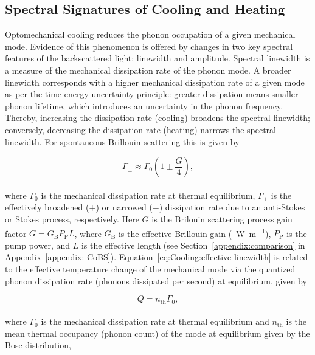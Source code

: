 \subsection{Spectral Signatures of Cooling and Heating}
\label{Cooling:subsec:SpectralSignaturesofCoolingandHeating}

Optomechanical cooling reduces the phonon occupation of a given mechanical mode. Evidence of this phenomenon is offered by changes in two key spectral features of the backscattered light: linewidth and amplitude. Spectral linewidth is a measure of the mechanical dissipation rate of the phonon mode. A broader linewidth corresponds with a higher mechanical dissipation rate of a given mode as per the time-energy uncertainty principle: greater dissipation means smaller phonon lifetime, which introduces an uncertainty in the phonon frequency. Thereby, increasing the dissipation rate (cooling) broadens the spectral linewidth; conversely, decreasing the dissipation rate (heating) narrows the spectral linewidth. For spontaneous Brillouin scattering this is given by \cite{otterstrom2018optomechanical}

\begin{equation}
  \Gamma_{\pm} \approx \Gamma_{0}\left(1 \pm \frac{G}{4}\right),
  \label{eq:Cooling:effective linewidth}
\end{equation}
\\
where \(\Gamma_{0}\) is the mechanical dissipation rate at thermal equilibrium, \(\Gamma_{\pm}\) is the effectively broadened (\(+\)) or narrowed (\(-\)) dissipation rate due to an anti-Stokes or Stokes process, respectively. Here \(G\) is the Brilouin scattering process gain factor \(G = G_{\mathrm{B}}P_{\mathrm{P}}L\), where \(G_{\mathrm{B}}\) is the effective Brillouin gain (\si{\per\watt\per\meter}), \(P_{\mathrm{P}}\) is the pump power, and \(L\) is the effective length (see Section~\ref{appendix:comparison} in Appendix~\ref{appendix: CoBS}). Equation~\ref{eq:Cooling:effective linewidth} is related to the effective temperature change of the mechanical mode via the quantized phonon dissipation rate (phonons dissipated per second) at equilibrium, given by

\begin{equation}
  Q = n_{\mathrm{th}}\Gamma_{0},
  \label{eq:Cooling:Q}
\end{equation}
\\
where \(\Gamma_{0}\) is the mechanical dissipation rate at thermal equilibrium and \(n_{\mathrm{th}}\) is the mean thermal occupancy (phonon count) of the mode at equilibrium given by the Bose distribution,

